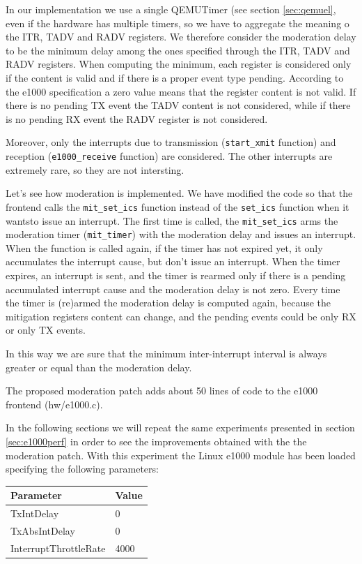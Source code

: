 \vspace{0.5cm}

In our implementation we use a single QEMUTimer (see section \ref{sec:qemuel}, even if the hardware has multiple timers, so we have to 
aggregate the meaning o the ITR, TADV and RADV registers.
We therefore consider the moderation delay to be the minimum delay among the ones specified through the ITR, TADV and RADV registers.
When computing the minimum, each register is considered only if the content is valid and if there is a proper event type pending.
According to the e1000 specification a zero value means that the register content is not valid. If there is no pending TX event
the TADV content is not considered, while if there is no pending RX event the RADV register is not considered.

Moreover, only the interrupts due to transmission (\texttt{start\_xmit} function) and reception (\texttt{e1000\_receive}
function) are considered. The other interrupts are extremely rare, so they are not intersting.


\vspace{0.5cm}
Let's see how moderation is implemented. We have modified the code so that the frontend calls the \texttt{mit\_set\_ics} function instead
of the \texttt{set\_ics} function when it wantsto issue an interrupt.
The first time is called, the \texttt{mit\_set\_ics} arms the moderation timer (\texttt{mit\_timer}) with the moderation delay and issues 
an interrupt.
When the function is called again, if the timer has not expired yet, it only accumulates the interrupt cause, but don't issue an interrupt.
When the timer expires, an interrupt is sent, and the timer is rearmed only if there is a pending accumulated interrupt cause and
the moderation delay is not zero.
Every time the timer is (re)armed the moderation delay is computed again, because the mitigation registers content can change, and
the pending events could be only RX or only TX events.

In this way we are sure that the minimum inter-interrupt interval is always greater or equal than the moderation delay.

\vspace{0.5cm}

The proposed moderation patch adds about 50 lines of code to the e1000 frontend (hw/e1000.c).

\vspace{0.5cm}

In the following sections we will repeat the same experiments presented in section \ref{sec:e1000perf} in order to see the improvements
obtained with the the moderation patch. With this experiment the Linux e1000 module has been loaded specifying the following parameters:
\begin{center}
\begin{tabular}{ll}
\toprule
\textbf{Parameter} & \textbf{Value}\\
\midrule
TxIntDelay & 0\\
TxAbsIntDelay & 0\\
InterruptThrottleRate & 4000\\
\bottomrule
\end{tabular}
\end{center}

